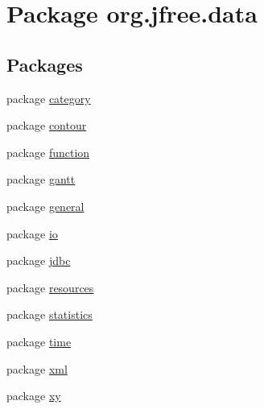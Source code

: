 \hypertarget{namespaceorg_1_1jfree_1_1data}{}\section{Package org.\+jfree.\+data}
\label{namespaceorg_1_1jfree_1_1data}
\subsection*{Packages}
\begin{DoxyCompactItemize}
\item 
package \mbox{\hyperlink{namespaceorg_1_1jfree_1_1data_1_1category}{category}}
\item 
package \mbox{\hyperlink{namespaceorg_1_1jfree_1_1data_1_1contour}{contour}}
\item 
package \mbox{\hyperlink{namespaceorg_1_1jfree_1_1data_1_1function}{function}}
\item 
package \mbox{\hyperlink{namespaceorg_1_1jfree_1_1data_1_1gantt}{gantt}}
\item 
package \mbox{\hyperlink{namespaceorg_1_1jfree_1_1data_1_1general}{general}}
\item 
package \mbox{\hyperlink{namespaceorg_1_1jfree_1_1data_1_1io}{io}}
\item 
package \mbox{\hyperlink{namespaceorg_1_1jfree_1_1data_1_1jdbc}{jdbc}}
\item 
package \mbox{\hyperlink{namespaceorg_1_1jfree_1_1data_1_1resources}{resources}}
\item 
package \mbox{\hyperlink{namespaceorg_1_1jfree_1_1data_1_1statistics}{statistics}}
\item 
package \mbox{\hyperlink{namespaceorg_1_1jfree_1_1data_1_1time}{time}}
\item 
package \mbox{\hyperlink{namespaceorg_1_1jfree_1_1data_1_1xml}{xml}}
\item 
package \mbox{\hyperlink{namespaceorg_1_1jfree_1_1data_1_1xy}{xy}}
\end{DoxyCompactItemize}
